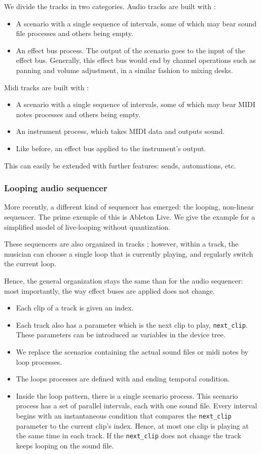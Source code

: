 \documentclass[applsci,article,submit,moreauthors,pdftex,10pt,a4paper]{mdpi}
\begin{document}
We divide the tracks in two categories.
Audio tracks are built with : 
\begin{itemize}
  \item A scenario with a single sequence of intervals, some of which may bear sound file processes and others being empty.
  \item An effect bus process. The output of the scenario goes to the input of the effect bus. Generally, this effect bus would end by channel operations such as panning and volume adjustment, in a similar fashion to mixing desks.
\end{itemize} 

Midi tracks are built with : 
\begin{itemize}
    \item A scenario with a single sequence of intervals, some of which may bear MIDI notes processes and others being empty.
    \item An instrument process, which takes MIDI data and outputs sound.
    \item Like before, an effect bus applied to the instrument's output.
\end{itemize}

This can easily be extended with further features: sends, automations, etc.
\subsubsection{Looping audio sequencer}
More recently, a different kind of sequencer has emerged: the looping, non-linear sequencer. 
The prime exemple of this is Ableton Live. We give the example for a simplified model of live-looping without quantization.

These sequencers are also organized in tracks ; however, within a track, the musician can choose a single loop 
that is currently playing, and regularly switch the current loop.

Hence, the general organization stays the same than for the audio sequencer: most importantly, the way effect buses are applied does not change.

\begin{itemize}
    \item Each clip of a track is given an index. 
    \item Each track also has a parameter which is the next clip to play, \lstinline|next_clip|. These parameters can be introduced as variables in the device tree.
    \item We replace the scenarios containing the actual sound files or midi notes by loop processes. 
    \item The loops processes are defined with and ending temporal condition. 
    \item Inside the loop pattern, there is a single scenario process. This scenario process has a set of parallel intervals, each with one sound file. Every interval begins with an instantaneous condition that compares the \lstinline|next_clip| parameter to the current clip's index. Hence, at most one clip is playing at the same time in each track. If the \lstinline|next_clip| does not change the track keeps looping on the sound file.
\end{itemize}
\end{document}
